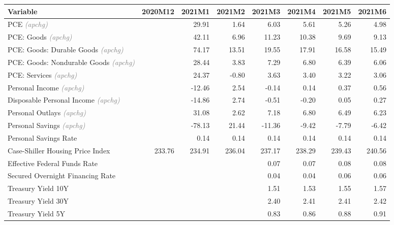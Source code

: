 \documentclass[11pt, letterpaper]{article}\usepackage[]{graphicx}\usepackage[]{color}
\begin{document}
\begin{table}[H]
\centering
\begingroup\fontsize{10pt}{12pt}\selectfont
\begin{tabular}{lrrrrrrr}
  \hline
Variable & 2020M12 & 2021M1 & 2021M2 & 2021M3 & 2021M4 & 2021M5 & 2021M6 \\ 
  \hline
PCE \textit{\footnotesize\textcolor{gray}{(apchg)}} &  & 29.91 & 1.64 & 6.03 & 5.61 & 5.26 & 4.98 \\ 
  PCE: Goods \textit{\footnotesize\textcolor{gray}{(apchg)}} &  & 42.11 & 6.96 & 11.23 & 10.38 & 9.69 & 9.13 \\ 
  PCE: Goods: Durable Goods \textit{\footnotesize\textcolor{gray}{(apchg)}} &  & 74.17 & 13.51 & 19.55 & 17.91 & 16.58 & 15.49 \\ 
  PCE: Goods: Nondurable Goods \textit{\footnotesize\textcolor{gray}{(apchg)}} &  & 28.44 & 3.83 & 7.29 & 6.80 & 6.39 & 6.06 \\ 
  PCE: Services \textit{\footnotesize\textcolor{gray}{(apchg)}} &  & 24.37 & -0.80 & 3.63 & 3.40 & 3.22 & 3.06 \\ 
  Personal Income \textit{\footnotesize\textcolor{gray}{(apchg)}} &  & -12.46 & 2.54 & -0.14 & 0.14 & 0.37 & 0.56 \\ 
  Disposable Personal Income \textit{\footnotesize\textcolor{gray}{(apchg)}} &  & -14.86 & 2.74 & -0.51 & -0.20 & 0.05 & 0.27 \\ 
  Personal Outlays \textit{\footnotesize\textcolor{gray}{(apchg)}} &  & 31.08 & 2.62 & 7.18 & 6.80 & 6.49 & 6.23 \\ 
  Personal Savings \textit{\footnotesize\textcolor{gray}{(apchg)}} &  & -78.13 & 21.44 & -11.36 & -9.42 & -7.79 & -6.42 \\ 
  Personal Savings Rate &  & 0.14 & 0.14 & 0.14 & 0.14 & 0.14 & 0.14 \\ 
  Case-Shiller Housing Price Index & 233.76 & 234.91 & 236.04 & 237.17 & 238.29 & 239.43 & 240.56 \\ 
  Effective Federal Funds Rate &  &  &  & 0.07 & 0.07 & 0.08 & 0.08 \\ 
  Secured Overnight Financing Rate &  &  &  & 0.04 & 0.04 & 0.06 & 0.06 \\ 
  Treasury Yield 10Y &  &  &  & 1.51 & 1.53 & 1.55 & 1.57 \\ 
  Treasury Yield 30Y &  &  &  & 2.40 & 2.41 & 2.41 & 2.42 \\ 
  Treasury Yield 5Y &  &  &  & 0.83 & 0.86 & 0.88 & 0.91 \\ 

\end{tabular}
\end{table}
\end{document}
